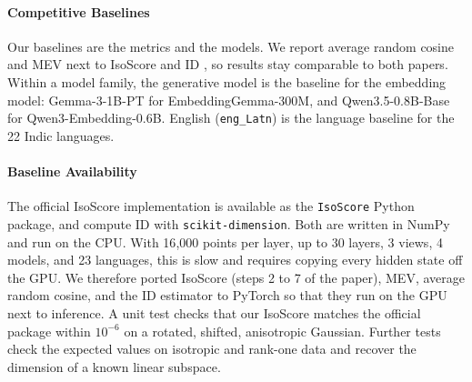 \paragraph{Competitive Baselines}
Our baselines are the metrics and the models. We report average random cosine and MEV \citep{ethayarajh-2019-contextual} next to IsoScore and ID \citep{rudman-etal-2022-isoscore}, so results stay comparable to both papers. Within a model family, the generative model is the baseline for the embedding model: Gemma-3-1B-PT for EmbeddingGemma-300M, and Qwen3.5-0.8B-Base for Qwen3-Embedding-0.6B. English (\texttt{eng\_Latn}) is the language baseline for the 22 Indic languages.

\paragraph{Baseline Availability}
The official IsoScore implementation is available as the \texttt{IsoScore} Python package, and \citet{rudman-etal-2022-isoscore} compute ID with \texttt{scikit-dimension}. Both are written in NumPy and run on the CPU. With 16{,}000 points per layer, up to 30 layers, 3 views, 4 models, and 23 languages, this is slow and requires copying every hidden state off the GPU. We therefore ported IsoScore (steps 2 to 7 of the paper), MEV, average random cosine, and the ID estimator to PyTorch so that they run on the GPU next to inference. A unit test checks that our IsoScore matches the official package within $10^{-6}$ on a rotated, shifted, anisotropic Gaussian. Further tests check the expected values on isotropic and rank-one data and recover the dimension of a known linear subspace.
